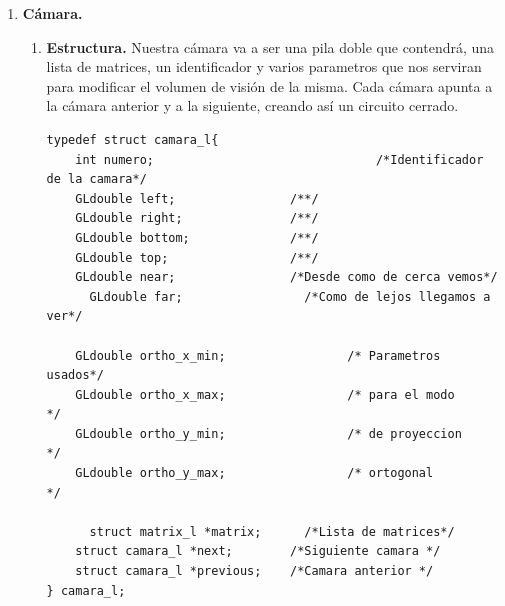 \documentclass[12pt,a4paper]{article}
\begin{document}
\begin{enumerate}
\item \textbf{Cámara.}\newline

\begin{enumerate}
\item \textbf{Estructura.}
Nuestra cámara va a ser una pila doble que contendrá, una lista de matrices, un identificador y varios parametros que nos serviran para modificar el volumen de visión de la misma.\newline
Cada cámara apunta a la cámara anterior y a la siguiente, creando así un circuito cerrado.\newline
\begin{lstlisting}
typedef struct camara_l{
    int numero;							      /*Identificador de la camara*/
    GLdouble left;                /**/
    GLdouble right;               /**/
    GLdouble bottom;              /**/
    GLdouble top;                 /**/
    GLdouble near;                /*Desde como de cerca vemos*/
	  GLdouble far;                 /*Como de lejos llegamos a ver*/

  	GLdouble ortho_x_min;				  /* Parametros usados*/
  	GLdouble ortho_x_max;				  /* para el modo     */
  	GLdouble ortho_y_min;				  /* de proyeccion    */
  	GLdouble ortho_y_max;				  /* ortogonal        */

	  struct matrix_l *matrix;      /*Lista de matrices*/
    struct camara_l *next;        /*Siguiente camara */
    struct camara_l *previous;    /*Camara anterior */
} camara_l;
\end{lstlisting}


\end{enumerate}
\end{enumerate}
\end{document}
